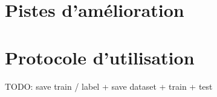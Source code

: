 \documentclass{report}
\begin{document}
\chapter{Pistes d'amélioration}

\chapter{Protocole d'utilisation}

TODO: save train / label + save dataset + train + test
\end{document}
